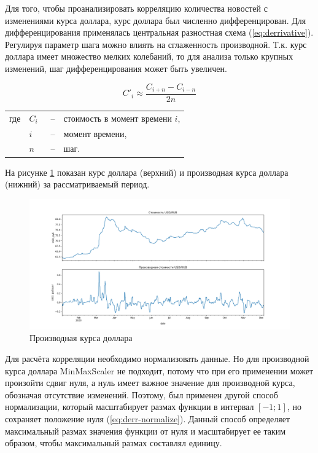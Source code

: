 Для того, чтобы проанализировать корреляцию количества новостей с изменениями курса доллара, курс доллара был численно дифференцирован. Для дифференцирования применялась центральная разностная схема (\ref{eq:derrivative}). Регулируя параметр шага можно влиять на сглаженность производной. Т.к. курс доллара имеет множество мелких колебаний, то для анализа только крупных изменений, шаг дифференцирования может быть увеличен.

\begin{equation}
    C'_i \approx \frac{C_{i+n} - C_{i-n}}{2n}
    \label{eq:derrivative}
\end{equation}
\noindent\begin{tabularx}{\linewidth}{lllX}
    где & $C_i$    &~--& стоимость в момент времени $i$, \\
        & $i$      &~--& момент времени, \\
        & $n$      &~--& шаг. \\
\end{tabularx}

На рисунке \ref{img:usd_derrivative} показан курс доллара (верхний) и производная курса доллара (нижний) за рассматриваемый период.

\begin{figure}[h]
    \centering
    \includegraphics[width=\linewidth]{images/correlations/usd_derrivative.png}
    \caption{Производная курса доллара}
    \label{img:usd_derrivative}
\end{figure}

Для расчёта корреляции необходимо нормализовать данные. Но для производной курса доллара MinMaxScaler не подходит, потому что при его применении может произойти сдвиг нуля, а нуль имеет важное значение для производной курса, обозначая отсутствие изменений. Поэтому, был применен другой способ нормализации, который масштабирует размах функции в интервал $[-1; 1]$, но сохраняет положение нуля (\ref{eq:derr-normalize}). Данный способ определяет максимальный размах значения функции от нуля и масштабирует ее таким образом, чтобы максимальный размах составлял единицу.

